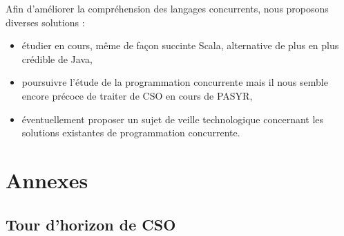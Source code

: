 \documentclass[a4paper,11pt,french]{report}
\begin{document}
Afin d'améliorer la compréhension des langages concurrents, nous proposons diverses solutions :

\begin{itemize}
\item étudier en cours, même de façon succinte Scala, alternative de plus en plus crédible de Java,
\item poursuivre l'étude de la programmation concurrente mais il nous semble encore précoce de traiter de CSO en cours de PASYR,
\item éventuellement proposer un sujet de veille technologique concernant les solutions existantes de programmation concurrente.
\end{itemize}

\part{Annexes}
\appendix
\chapter{ Tour d'horizon de CSO }
\label{chap:cso}
\end{document}
